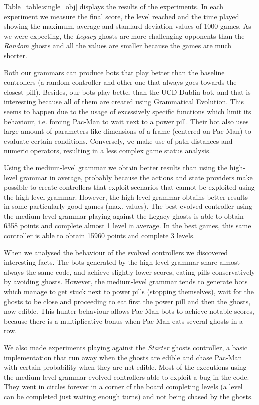 \documentclass{llncs}
\newcommand{\paco}{Pac-Man }
\begin{document}
Table~\ref{table:single_obj} displays the results of the experiments. In each experiment we measure the final score, the level reached and the time played showing the maximum, average and standard deviation values of 1000 games. As we were expecting, the \emph{Legacy} ghosts are more challenging opponents than the \emph{Random} ghosts and all the values are smaller because the games are much shorter. 

Both our grammars can produce bots that play better than the baseline controllers (a random controller and other one that always goes towards the closest pill). Besides, our bots play better than the UCD Dublin bot, and that is interesting because all of them are created using Grammatical Evolution. This seems to happen due to the usage of excessively specific functions which limit its behaviour, i.e. forcing \paco to wait next to a power pill. Their bot also uses large amount of parameters like dimensions of a frame (centered on Pac-Man) to evaluate certain conditions. Conversely, we make use of path distances and numeric operators, resulting in a less complex game status analysis.

Using the medium-level grammar we obtain better results than using the high-level grammar in average, probably because the actions and state providers make possible to create controllers that exploit scenarios that cannot be exploited using the high-level grammar. However, the high-level grammar obtains better results in some particularly good games (max. values). The best evolved controller using the medium-level grammar playing against the Legacy ghosts is able to obtain 6358 points and complete almost 1 level in average. In the best games, this same controller is able to obtain 15960 points and complete 3 levels.

When we analysed the behaviour of the evolved controllers we discovered interesting facts. The bots generated by the high-level grammar share almost always the same code, and achieve slightly lower scores, eating pills conservatively by avoiding ghosts. However, the medium-level grammar tends to generate bots which manage to get stuck next to power pills (stopping themselves), wait for the ghosts to be close and proceeding to eat first the power pill and then the ghosts, now edible. This hunter behaviour allows \paco bots to achieve notable scores, because there is a multiplicative bonus when \paco eats several ghosts in a row.

We also made experiments playing against the \emph{Starter} ghosts controller, a basic implementation that run away when the ghosts are edible and chase \paco with certain probability when they are not edible. Most of the executions using the medium-level grammar evolved controllers able to exploit a bug in the code. They went in circles forever in a corner of the board completing levels (a level can be completed just waiting enough turns) and not being chased by the ghosts.
\end{document}
